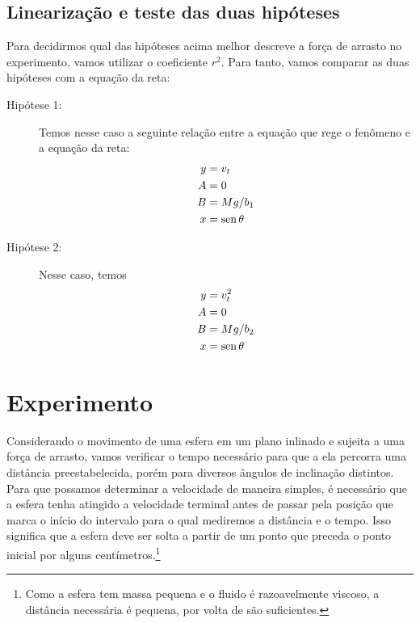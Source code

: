 \subsection{Linearização e teste das duas hipóteses}

Para decidirmos qual das hipóteses acima melhor descreve a força de arrasto no experimento, vamos utilizar o coeficiente $r^2$. Para tanto, vamos comparar as duas hipóteses com a equação da reta:
\begin{description}
	\item[Hipótese 1:] Temos nesse caso a seguinte relação entre a equação que rege o fenômeno e a equação da reta:
		\begin{align}
			y &= v_t \\
			A &= 0 \\
			B &= Mg/b_1 \\
			x &= \operatorname{sen}\theta
		\end{align}

	\item[Hipótese 2:] Nesse caso, temos
		\begin{align}
			y &= v_t^2 \\
			A &= 0 \\
			B &= Mg/b_2 \\
			x &= \operatorname{sen}\theta
		\end{align}
\end{description}

\section{Experimento}

Considerando o movimento de uma esfera em um plano inlinado e sujeita a uma força de arrasto, vamos verificar o tempo necessário para que a ela percorra uma distância preestabelecida, porém para diversos ângulos de inclinação distintos. Para que possamos determinar a velocidade de maneira simples, é necessário que a esfera tenha atingido a velocidade terminal antes de passar pela posição que marca o início do intervalo para o qual mediremos a distância e o tempo. Isso significa que a esfera deve ser solta a partir de um ponto que preceda o ponto inicial por alguns centímetros.\footnote[][-3cm]{Como a esfera tem massa pequena e o fluido é razoavelmente viscoso, a distância necessária é pequena, por volta de  são suficientes.}

